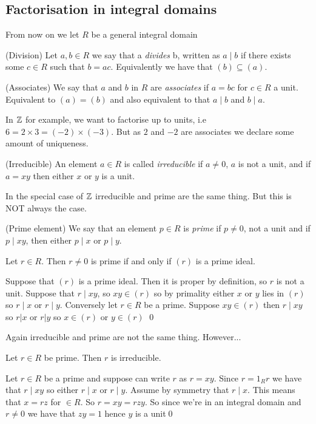 \documentclass{article}
\begin{document}
\subsection{Factorisation in integral domains}
From now on we let $ R $ be a general integral domain
\begin{definition}
	(Division) Let $ a,b\in R $ we say that a \textit{divides} b, written as $ a\mid b $ if there exists some $ c \in R $ such that $ b=ac $. Equivalently we have that $ (b)\subseteq (a) $.
\end{definition}
\begin{definition}
	(Associates) We say that $ a $ and $ b $ in $ R $ are \textit{associates} if $ a=bc $ for $ c\in R $ a unit. Equivalent to $ (a)=(b) $ and also equivalent to that $ a\mid b $ and $ b\mid a $.
\end{definition}
In $ \mathbb{Z} $ for example, we want to factorise up to units, i.e $ 6=2\times 3 = (-2)\times (-3) $. But as $ 2 $ and $ -2 $ are associates we declare some amount of uniqueness.
\begin{definition}
	(Irreducible) An element $ a\in R $ is called \textit{irreducible} if $ a\ne 0 $, $ a $ is not a unit, and if $ a=xy $ then either $ x $ or $ y $ is a unit.
\end{definition}
In the special case of $ \mathbb{Z} $ irreducible and prime are the same thing. But this is NOT always the case.
\begin{definition}
	(Prime element) We say that an element $ p\in R $ is \textit{prime} if $ p\ne 0 $, not a unit and if $ p\mid xy $, then either $ p\mid x $ or $ p\mid y $.
\end{definition}
\begin{proposition}
  Let $ r\in R $. Then $ r\ne 0 $ is prime if and only if $ (r) $ is a prime ideal.
\end{proposition}
\pf Suppose that $ (r) $ is a prime ideal. Then it is proper by definition, so $ r $ is not a unit. Suppose that $ r\mid xy $, so $ xy\in (r) $ so by primality either $ x $ or $ y $ lies in $ (r) $ so $ r\mid x $ or $ r\mid y $.
Conversely let $ r\in R $ be a prime. Suppose $ xy\in (r) $ then $ r\mid xy $ so $ r|x $ or $ r|y $ so $ x\in (r) $ or $ y\in (r) $ \qed\par
Again irreducible and prime are not the same thing. However...
\begin{proposition}
  Let $ r\in R $ be prime. Then $ r $ is irreducible.
\end{proposition}
\pf Let $ r\in R $ be a prime and suppose can write $ r $ as $ r=xy $. Since $ r=1_Rr $ we have that $ r\mid xy $ so either $ r\mid x $ or $ r\mid y $. Assume by symmetry that $ r\mid x $. This means that $ x=rz $ for $ \in R $. So $ r=xy=rzy $. So since we're in an integral domain and $ r\ne 0 $ we have that $ zy=1 $ hence $ y $ is a unit\qed\par
\end{document}
